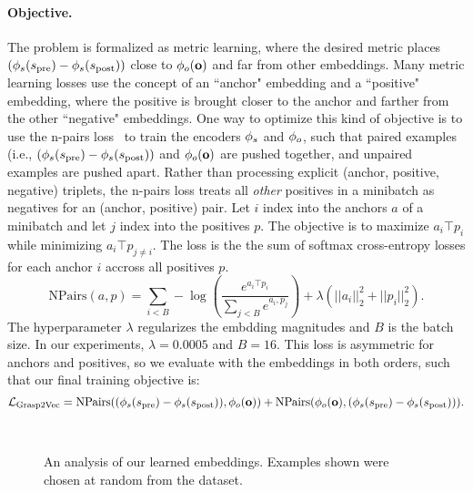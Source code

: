 \documentclass{article}
\begin{document}
\paragraph{Objective.}
\label{sec:npairs}
The problem is formalized as metric learning, where the desired metric places $(\phi_s(s_\text{pre})-\phi_s(s_\text{post}))$ close to $\phi_o(\mathbf{o})$ and far from other embeddings. Many metric learning losses use the concept of an ``anchor" embedding and a ``positive" embedding, where the positive is brought closer to the anchor and farther from the other ``negative" embeddings.
One way to optimize this kind of objective is to use the n-pairs loss~\cite{Sohn2016Npairs} to train the encoders $\phi_s$ and $\phi_o$,
such that paired examples (i.e., $(\phi_s(s_\text{pre})-\phi_s(s_\text{post}))$ and $\phi_o(\mathbf{o})$
are pushed together, and unpaired examples are pushed apart.
Rather than processing explicit (anchor, positive, negative) triplets, the n-pairs loss treats all \textit{other} positives in a minibatch as negatives for an (anchor, positive) pair. Let $i$ index into the anchors $a$ of a minibatch and let $j$ index into the positives $p$. The objective is to maximize $a_i\top p_i$ while minimizing $a_i\top p_{j\neq i}$.
The loss is the the sum of softmax cross-entropy losses for each anchor $i$ accross all positives $p$.
\[\text{NPairs}(a, p) = \sum_{i<B} -\log \left( \frac{e^{a_i\top p_i}}{\sum_{j<B} e^{a_i,p_j}} \right) +\lambda( ||a_i||_2^2+||p_i||_2^2).\]
The hyperparameter $\lambda$ regularizes the embdding magnitudes and $B$ is the batch size. In our experiments, $\lambda=0.0005$ and $B=16$.
This loss is asymmetric for anchors and positives, so we evaluate with the embeddings in both orders, such that our final training objective is:
\[\mathcal{L}_\text{Grasp2Vec} = \text{NPairs}((\phi_s(s_\text{pre})-\phi_s(s_\text{post})), \phi_o(\mathbf{o})) + \text{NPairs}( \phi_o(\mathbf{o}), (\phi_s(s_\text{pre})-\phi_s(s_\text{post}))).\]

\begin{figure*}
\vspace{-0.05in}
\centering
{}
\\
\caption{An analysis of our learned embeddings. Examples shown were chosen at random from the dataset.}
\vspace{-0.2in}
\end{figure*}
\end{document}
